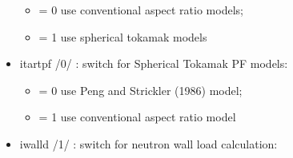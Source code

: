 \documentclass[]{article}
\providecommand{\tightlist}{%
  \setlength{\itemsep}{0pt}\setlength{\parskip}{0pt}}
\begin{document}
\begin{itemize}
  \begin{itemize}
  \tightlist
  \item
    = 0 use conventional aspect ratio models;
  \item
    = 1 use spherical tokamak models
  \end{itemize}
\item
  itartpf /0/ : switch for Spherical Tokamak PF models:

  \begin{itemize}
  \tightlist
  \item
    = 0 use Peng and Strickler (1986) model;
  \item
    = 1 use conventional aspect ratio model
  \end{itemize}
\item
  iwalld /1/ : switch for neutron wall load calculation:


\end{itemize}
\end{document}

